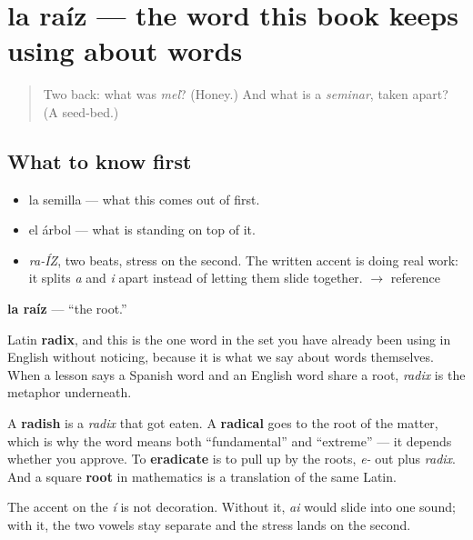 \section[la raíz]{la raíz — the word this book keeps using about words}

\label{lesson:ES-C291-raiz}



\begin{quote}
Two back: what was \emph{mel}? (Honey.) And what is a \emph{seminar}, taken apart? (A seed-bed.)
\end{quote}

\subsection*{What to know first}
\begin{itemize}
\raggedright
  \item la semilla — what this comes out of first.
  \item el árbol — what is standing on top of it.
\end{itemize}

\begin{sounds}
\begin{itemize}
\raggedright
  \item \emph{ra-ÍZ}, two beats, stress on the second. The written accent is doing real work: it splits \emph{a} and \emph{i} apart instead of letting them slide together. $\to$ reference
\end{itemize}
\end{sounds}

\begin{cousinweb}
\textbf{la raíz} — \textquotedblleft{}the root.\textquotedblright{}

Latin \textbf{radix}, and this is the one word in the set you have already been using in English without noticing, because it is what we say about words themselves. When a lesson says a Spanish word and an English word share a root, \emph{radix} is the metaphor underneath.

A \textbf{radish} is a \emph{radix} that got eaten. A \textbf{radical} goes to the root of the matter, which is why the word means both \textquotedblleft{}fundamental\textquotedblright{} and \textquotedblleft{}extreme\textquotedblright{} — it depends whether you approve. To \textbf{eradicate} is to pull up by the roots, \emph{e-} out plus \emph{radix}. And a square \textbf{root} in mathematics is a translation of the same Latin.

The accent on the \emph{í} is not decoration. Without it, \emph{ai} would slide into one sound; with it, the two vowels stay separate and the stress lands on the second.
\end{cousinweb}

